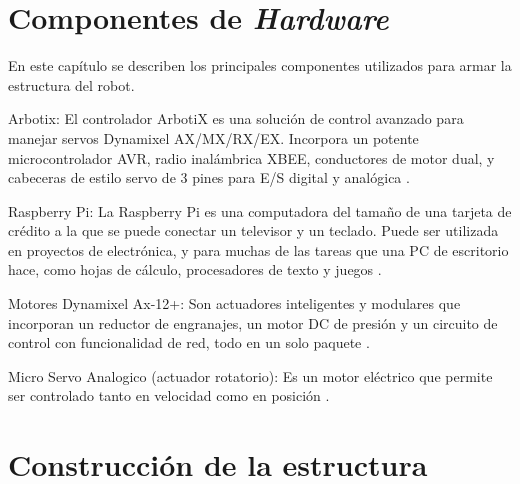 \documentclass[conference, letterpaper]{IEEEtranMC1}
\begin{document}
\section{Componentes de \emph{Hardware}}
\label{sec:Componentesdehardware}


En este capítulo se describen los principales componentes utilizados para armar la estructura del robot. 

Arbotix: El controlador ArbotiX es una solución de control avanzado para manejar servos Dynamixel AX/MX/RX/EX. Incorpora un potente microcontrolador AVR, radio inalámbrica XBEE, conductores de motor dual, y cabeceras de estilo servo de 3 pines para E/S digital y analógica \cite{arbotix}.
 
Raspberry Pi: La Raspberry Pi es una computadora del tamaño de una tarjeta de crédito a la que se puede conectar un televisor y un teclado. Puede ser utilizada en proyectos de electrónica, y para muchas de las tareas que una PC de escritorio hace, como hojas de cálculo, procesadores de texto y juegos \cite{raspberry}.

Motores Dynamixel Ax-12+: Son actuadores inteligentes y modulares que incorporan un reductor de engranajes, un motor DC de presión y un circuito de control con funcionalidad de red, todo en un solo paquete \cite{manual}.

Micro Servo Analogico (actuador rotatorio): Es un motor eléctrico que permite ser controlado tanto en velocidad como en posición  \cite{robots}.



\section{Construcción de la estructura}
\label{sec:Estru}
\end{document}
